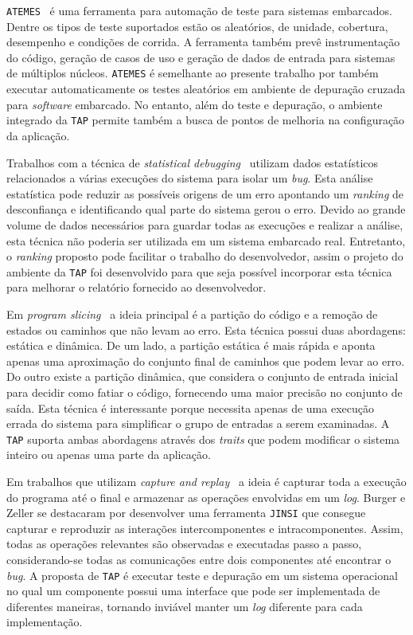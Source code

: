 \documentclass[conference]{IEEEtran}
\begin{document}
\texttt{ATEMES}~\cite{atemes} é uma ferramenta para automação de teste para sistemas embarcados. Dentre os tipos de teste suportados estão os aleatórios, de unidade, cobertura, desempenho e condições de corrida. A ferramenta também prevê instrumentação do código, geração de casos de uso e geração de dados de entrada para sistemas de múltiplos núcleos. \texttt{ATEMES} é semelhante ao presente trabalho por também executar automaticamente os testes aleatórios em ambiente de depuração cruzada para \textit{software} embarcado. No entanto, além do teste e depuração, o ambiente integrado da \texttt{TAP} permite também a busca de pontos de melhoria na configuração da aplicação.

Trabalhos com a técnica de \textit{statistical debugging}~\cite{zheng2006statistical,zhang2009capturing,parsa2011statistical} utilizam dados estatísticos relacionados a várias execuções do sistema para isolar um \textit{bug}. Esta análise estatística pode reduzir as possíveis origens de um erro apontando um \textit{ranking} de desconfiança e identificando qual parte do sistema gerou o erro. Devido ao grande volume de dados necessários para guardar todas as execuções e realizar a análise, esta técnica não poderia ser utilizada em um sistema embarcado real. Entretanto, o \textit{ranking} proposto pode facilitar o trabalho do desenvolvedor, assim o projeto do ambiente da \texttt{TAP} foi desenvolvido para que seja possível incorporar esta técnica para melhorar o relatório fornecido ao desenvolvedor.

Em \textit{program slicing}~\cite{sasirekha2011program, Xu:2005:BSP:1050849.1050865,artho2011iterative} a ideia principal é a partição do código e a remoção de estados ou caminhos que não levam ao erro. Esta técnica possui duas abordagens: estática e dinâmica. De um lado, a partição estática é mais rápida e aponta apenas uma aproximação do conjunto final de caminhos que podem levar ao erro. Do outro existe a partição dinâmica, que considera o conjunto de entrada inicial para decidir como fatiar o código, fornecendo uma maior precisão no conjunto de saída. Esta técnica é interessante porque necessita apenas de uma execução errada do sistema para simplificar o grupo de entradas a serem examinadas. A \texttt{TAP} suporta ambas abordagens através dos \textit{traits} que podem modificar o sistema inteiro ou apenas uma parte da aplicação.

Em trabalhos que utilizam \textit{capture and replay}~\cite{burger2008replaying,qi2011locating,orso2005selective} a ideia é capturar toda a execução do programa até o final e armazenar as operações envolvidas em um \textit{log}. Burger e Zeller se destacaram por desenvolver uma ferramenta \texttt{JINSI} que consegue capturar e reproduzir as interações intercomponentes e intracomponentes. Assim, todas as operações relevantes são observadas e executadas passo a passo, considerando-se todas as comunicações entre dois componentes até encontrar o \textit{bug}. A proposta de \texttt{TAP} é executar teste e depuração em um sistema operacional no qual um componente possui uma interface que pode ser implementada de diferentes maneiras, tornando inviável manter um \textit{log} diferente para cada implementação.
\end{document}
